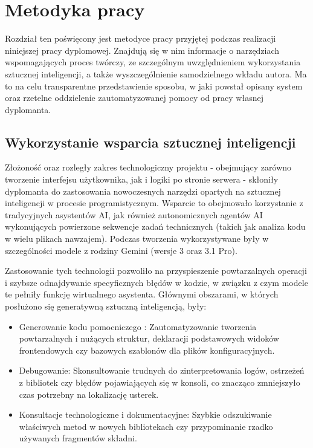 \chapter{Metodyka pracy}
\label{cha:methodology}

Rozdział ten poświęcony jest metodyce pracy przyjętej podczas realizacji niniejszej pracy dyplomowej. Znajdują się w nim informacje o narzędziach wspomagających proces twórczy, ze szczególnym uwzględnieniem wykorzystania sztucznej inteligencji, a także wyszczególnienie samodzielnego wkładu autora. Ma to na celu transparentne przedstawienie sposobu, w jaki powstał opisany system oraz rzetelne oddzielenie zautomatyzowanej pomocy od pracy własnej dyplomanta.

\section*{Wykorzystanie wsparcia sztucznej inteligencji}

Złożoność oraz rozległy zakres technologiczny projektu - obejmujący zarówno tworzenie interfejsu użytkownika, jak i logiki po stronie serwera - skłoniły dyplomanta do zastosowania nowoczesnych narzędzi opartych na sztucznej inteligencji w procesie programistycznym. Wsparcie to obejmowało korzystanie z tradycyjnych asystentów AI, jak również autonomicznych agentów AI wykonujących powierzone sekwencje zadań technicznych (takich jak analiza kodu w wielu plikach nawzajem). Podczas tworzenia wykorzystywane były w szczególności modele z rodziny Gemini (wersje 3 oraz 3.1 Pro).

Zastosowanie tych technologii pozwoliło na przyspieszenie powtarzalnych operacji i szybsze odnajdywanie specyficznych błędów w kodzie, w związku z czym modele te pełniły funkcję wirtualnego asystenta. Głównymi obszarami, w których posłużono się generatywną sztuczną inteligencją, były:
\begin{itemize}
    \item Generowanie kodu pomocniczego \cite{boilerplate_code}: Zautomatyzowanie tworzenia powtarzalnych i nużących struktur, deklaracji podstawowych widoków frontendowych czy bazowych szablonów dla plików konfiguracyjnych.
    \item Debugowanie: Skonsultowanie trudnych do zinterpretowania logów, ostrzeżeń z bibliotek czy błędów pojawiających się w konsoli, co znacząco zmniejszyło czas potrzebny na lokalizację usterek.
    \item Konsultacje technologiczne i dokumentacyjne: Szybkie odszukiwanie właściwych metod w nowych bibliotekach czy przypominanie rzadko używanych fragmentów składni.
\end{itemize}

